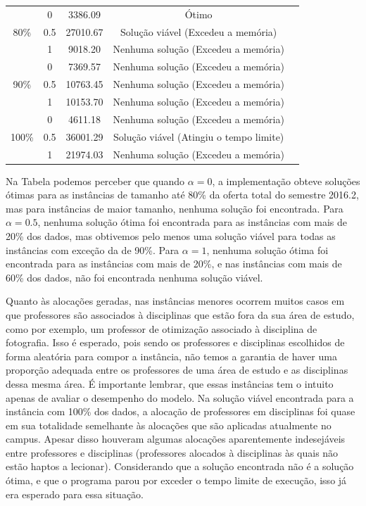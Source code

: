\begin{table}[h!]
{\begin{tabular}{ccccc}
			\midrule
			\multirow{3}{*}{80\%} &   0 &  3386.09 & Ótimo \\
			                      & 0.5 & 27010.67 & Solução viável (Excedeu a memória)\\
			                      &   1 &  9018.20 & Nenhuma solução (Excedeu a memória)\\
			\midrule
			\multirow{3}{*}{90\%} &   0 &  7369.57 & Nenhuma solução (Excedeu a memória)\\
			                      & 0.5 & 10763.45 & Nenhuma solução (Excedeu a memória)\\
			                      &   1 & 10153.70 & Nenhuma solução (Excedeu a memória)\\
			\midrule
			\multirow{3}{*}{100\%}&   0 &  4611.18 & Nenhuma solução (Excedeu a memória)\\
			                      & 0.5 & 36001.29 & Solução viável (Atingiu o tempo limite) \\
			                      &   1 & 21974.03 & Nenhuma solução (Excedeu a memória)\\
			\bottomrule
		\end{tabular}%
	}{
	}
\end{table}

\newpage

Na Tabela  podemos perceber que quando $\alpha = 0$, a implementação obteve soluções ótimas para as instâncias de tamanho até 80\% da oferta total do semestre 2016.2, mas para instâncias de maior tamanho, nenhuma solução foi encontrada. Para $\alpha = 0.5$, nenhuma solução ótima foi encontrada para as instâncias com mais de 20\% dos dados, mas obtivemos pelo menos uma solução viável para todas as instâncias com exceção da de 90\%. Para $\alpha = 1$, nenhuma solução ótima foi encontrada para as instâncias com mais de 20\%, e nas instâncias com mais de 60\% dos dados, não foi encontrada nenhuma solução viável.

Quanto às alocações geradas, nas instâncias menores ocorrem muitos casos em que professores são associados à disciplinas que estão fora da sua área de estudo, como por exemplo, um professor de otimização associado à disciplina de fotografia. Isso é esperado, pois sendo os professores e disciplinas escolhidos de forma aleatória para compor a instância, não temos a garantia de haver uma proporção adequada entre os professores de uma área de estudo e as disciplinas dessa mesma área. É importante lembrar, que essas instâncias tem o intuito apenas de avaliar o desempenho do modelo. Na solução viável encontrada para a instância com 100\% dos dados, a alocação de professores em disciplinas foi quase em sua totalidade semelhante às alocações que são aplicadas atualmente no campus. Apesar disso houveram algumas alocações aparentemente indesejáveis entre professores e disciplinas (professores alocados à disciplinas às quais não estão haptos a lecionar). Considerando que a solução encontrada não é a solução ótima, e que o programa parou por exceder o tempo limite de execução, isso já era esperado para essa situação.

